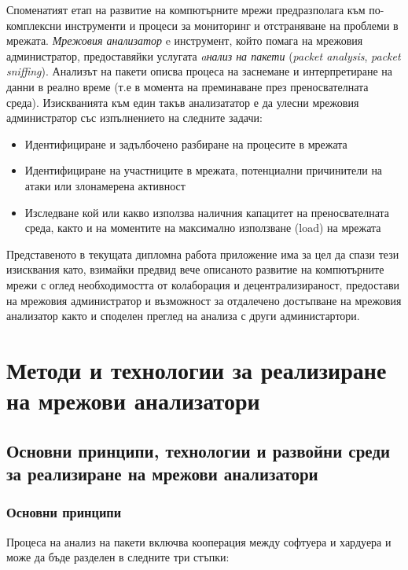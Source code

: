 \documentclass[12pt,a4paper,oneside]{book}
\begin{document}
Споменатият етап на развитие на компютърните мрежи предразполага към
по-комплексни инструменти и процеси за мониторинг и отстраняване на проблеми в
мрежата. \textit{Мрежовия анализатор}
e инструмент, който помага на мрежовия администратор, предоставяйки услугата
\textit{aнализ на пакети} (\textit{packet analysis}, \textit{packet sniffing}). Анализът на пакети
описва процеса на заснемане и интерпретиране на данни в реално време
(т.е в момента на преминаване през преносвателната среда). Изискванията към
един такъв анализататор е да улесни мрежовия администратор със изпълнението
на следните задачи:

\begin{itemize}
  \item
  Идентифициране и задълбочено разбиране на процесите в мрежата
\item
  Идентифициране на участниците в мрежата, потенциални причинители на атаки или
  злонамерена активност
\item
  Изследване кой или какво използва наличния капацитет на преносвателната
  среда, както и на моментите на максимално използване (load) на мрежата
\end{itemize}

Представеното в текущата дипломна работа приложение има за цел да спази тези
изисквания като, взимайки предвид вече описаното развитие на компютърните мрежи
с оглед необходимостта от колаборация и децентрализираност, предостави на
мрежовия администратор и възможност за отдалечено достъпване на мрежовия
анализатор както и споделен преглед на анализа с други администартори.

\justify
\chapter{Методи и технологии за реализиране на мрежови анализатори}

\section{Основни принципи, технологии и развойни среди за реализиране на мрежови
анализатори}

\subsection{Основни принципи}
Процеса на анализ на пакети включва кооперация между софтуера и хардуера и може
да бъде разделен в следните три стъпки:
\end{document}

